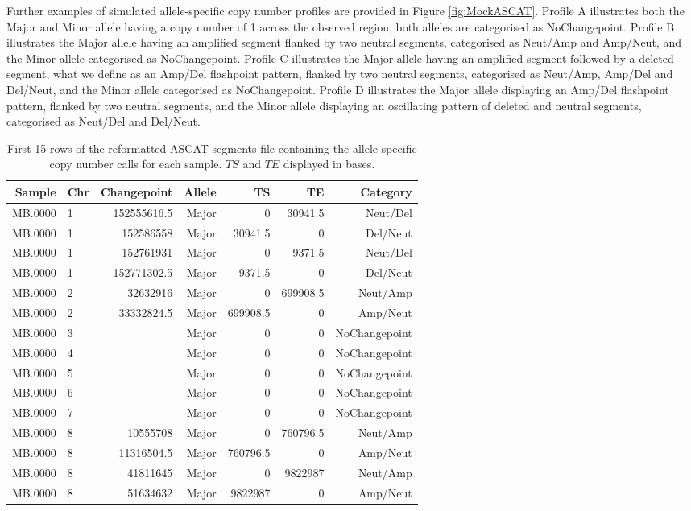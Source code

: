 Further examples of simulated allele-specific copy number profiles are provided in Figure \ref{fig:MockASCAT}. Profile A illustrates both the Major and Minor allele having a copy number of 1 across the observed region, both alleles are categorised as NoChangepoint. Profile B illustrates the Major allele having an amplified segment flanked by two neutral segments, categorised as Neut/Amp and Amp/Neut, and the Minor allele categorised as NoChangepoint. Profile C illustrates the Major allele having an amplified segment followed by a deleted segment, what we define as an Amp/Del flashpoint pattern, flanked by two neutral segments, categorised as Neut/Amp, Amp/Del and Del/Neut, and the Minor allele categorised as NoChangepoint. Profile D illustrates the Major allele displaying an Amp/Del flashpoint pattern, flanked by two neutral segments, and the Minor allele displaying an oscillating pattern of deleted and neutral segments, categorised as Neut/Del and Del/Neut. 

\begin{table}[H]
\vspace{-0.3cm}
\centering
\caption[First 15 rows of the reformatted ASCAT segments file containing the allele-specific copy number calls for each sample.]{First 15 rows of the reformatted ASCAT segments file containing the allele-specific copy number calls for each sample. $TS$ and $TE$ displayed in bases.}
\begin{tabular}{rlrrrrr}
  \hline
 Sample & Chr & Changepoint & Allele & TS & TE & Category \\ 
  \hline
MB.0000 & 1 & 152555616.5 & Major & 0 & 30941.5 & Neut/Del \\ 
MB.0000 & 1 & 152586558 & Major & 30941.5 & 0 & Del/Neut  \\ 
MB.0000 & 1 & 152761931 & Major & 0 & 9371.5 & Neut/Del \\ 
MB.0000 & 1 & 152771302.5 & Major & 9371.5 & 0 & Del/Neut \\ 
MB.0000 & 2 & 32632916 & Major & 0 & 699908.5 & Neut/Amp \\ 
MB.0000 & 2 & 33332824.5 & Major & 699908.5 & 0 & Amp/Neut  \\ 
MB.0000 & 3 &  & Major & 0 & 0 & NoChangepoint \\ 
MB.0000 & 4 &  & Major & 0 & 0 & NoChangepoint  \\ 
MB.0000 & 5 &  & Major & 0 & 0 & NoChangepoint  \\ 
 MB.0000 & 6 &  & Major & 0 & 0 & NoChangepoint  \\ 
 MB.0000 & 7 &  & Major & 0 & 0 & NoChangepoint  \\ 
 MB.0000 & 8 & 10555708 & Major & 0 & 760796.5 & Neut/Amp  \\ 
 MB.0000 & 8 & 11316504.5 & Major & 760796.5 & 0 & Amp/Neut  \\ 
 MB.0000 & 8 & 41811645 & Major & 0 & 9822987 & Neut/Amp \\ 
 MB.0000 & 8 & 51634632 & Major & 9822987 & 0 & Amp/Neut \\ 
   \hline
\end{tabular}
\label{ReformattedData}
\end{table}
 
